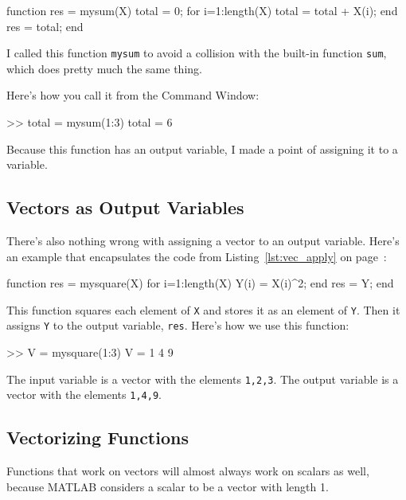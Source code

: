 \begin{code}
function res = mysum(X)
    total = 0;
    for i=1:length(X)
        total = total + X(i);
    end
    res = total;
end
\end{code}

I called this function \lstinline{mysum} to avoid a collision with the built-in
function \lstinline{sum}, which does pretty much the same thing.


Here's how you call it from the Command Window:

\begin{code}
>> total = mysum(1:3)
total = 6
\end{code}

Because this function has an output variable, I made a
point of assigning it to a variable.



\subsection{Vectors as Output Variables}

There's also nothing wrong with assigning a vector to an output
variable. Here's an example that encapsulates the code from
Listing~\ref{lst:vec_apply} on page~\pageref{lst:vec_apply}:

\begin{code}
function res = mysquare(X)
    for i=1:length(X)
        Y(i) = X(i)^2;
    end
    res = Y;
end
\end{code}

This function squares each element of \lstinline{X} and stores it as an element of \lstinline{Y}.  Then it assigns \lstinline{Y} to the output variable, \lstinline{res}.  Here's how we use this function:

\begin{code}
>> V = mysquare(1:3)
V = 1     4     9
\end{code}

The input variable is a vector with the elements \lstinline{1,2,3}.  The output variable is a vector with the elements \lstinline{1,4,9}.




\subsection{Vectorizing Functions}

Functions that work on vectors will almost always work on scalars
as well, because MATLAB considers a scalar to be a vector with
length 1.

